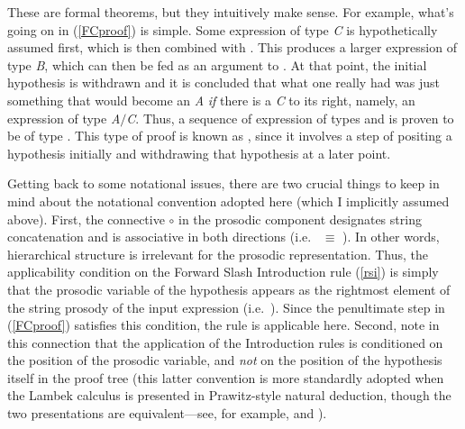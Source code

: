 \documentclass[output=paper
                ,modfonts
 	        ,biblatex
                ,babelshorthands
                ,newtxmath
                ,draftmode
                ,colorlinks, citecolor=brown
]{langscibook}
\begin{document}
\noindent
These are formal theorems, but they intuitively make sense.
For example, what's going on in  (\ref{FCproof}) is simple. 
Some expression of type  \textit{C} is 
hypothetically assumed first, which is then combined with
. This produces a larger expression
of type \textit{B}, which can then be fed as an argument to
. 
At that point, the initial hypothesis is withdrawn and it is concluded
that what one really had was just something that would become an \textit{A} \emph{if}
there is a \textit{C} to its right, namely, an expression of type \textit{A}\ensuremath{/}\textit{C}.
Thus, a sequence of expression of types  and 
is proven to be of type .  This type of proof
is known as , since it involves a step of
positing a hypothesis initially and withdrawing that hypothesis
at a later point.

Getting back to some notational issues, there are two crucial things
to keep in mind about the notational 
convention adopted here (which I implicitly assumed above). First, the
connective \ensuremath{\circ}\xspace in the prosodic component designates string
concatenation and is associative in both directions
(i.e.\  \pt{ (\ensuremath{\greekp_1} \ensuremath{\circ}\xspace \ensuremath{\greekp_2}) \ensuremath{\circ}\xspace \ensuremath{\greekp_3}} \ensuremath{ \equiv\xspace } \pt{ \ensuremath{\greekp_1} \ensuremath{\circ}\xspace (\ensuremath{\greekp_2} \ensuremath{\circ}\xspace \ensuremath{\greekp_3}) }). In other words, hierarchical
structure is irrelevant for the prosodic representation. Thus,
the applicability condition on the Forward Slash
Introduction rule (\ref{rsi}) is simply that
the prosodic variable \pt{ \ensuremath{\greekp} }
of the hypothesis appears as the rightmost element of the
string prosody of the input expression (i.e.\
\pt{\ptv{b} \ensuremath{\circ}\xspace \ensuremath{\greekp} }).
Since the penultimate step in (\ref{FCproof}) satisfies this 
condition, the rule is applicable here. Second, note in this
connection that the application of the
Introduction rules is conditioned on the position of the prosodic
variable, and \emph{not} on the position of the hypothesis itself in the
proof tree (this latter convention is more standardly adopted when the
Lambek calculus is presented in Prawitz-style natural deduction,
though the two presentations are
equivalent---see, for example, \citealt[Chapter 5]{Carpenter98a-u} and
\citealt[Chapter 1]{jaeger05}).
\end{document}
